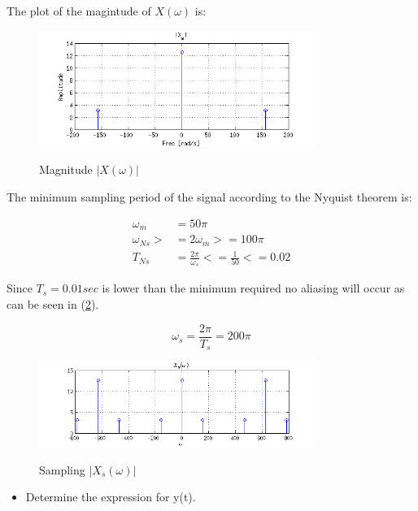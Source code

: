 The plot of the magintude of $X(\omega)$ is:

\begin{figure}[H]
\caption{Magnitude $|X(\omega)|$}
\centering
\includegraphics[width=0.8\textwidth]{figs/c3p33.png}
\label{fig:c3p33}
\end{figure} 

The minimum sampling period of the signal according to the Nyquist theorem is:

\begin{equation*}
\begin{aligned}
\omega_m &= 50 \pi \\
\omega_{Ns} >&= 2 \omega_m >= 100 \pi \\
T_{Ns} &= \frac{2 \pi}{\omega_s} <= \frac{1}{50} <= 0.02
\end{aligned}
\end{equation*} 

Since $T_s = 0.01 sec$ is lower than the minimum required no
aliasing will occur as can be seen in (\ref{fig:c3p3a}).

\begin{equation*}
\omega_s = \frac{2 \pi}{T_s} =  200 \pi
\end{equation*} 


\begin{figure}[H]
\caption{Sampling $|X_s(\omega)|$}
\centering
\includegraphics[width=0.8\textwidth]{figs/c3p3a.png}
\label{fig:c3p3a}
\end{figure}

\begin{itemize}
\item Determine the expression for y(t).
\end{itemize} 

